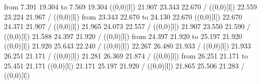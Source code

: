 {{\color[rgb]{0,0,0}\putrule from  7.391 19.304 to  7.569 19.304
}%
%
%
\linethickness=1pt
\setplotsymbol ({\makebox(0,0)[l]{\tencirc{}}})
{\color[rgb]{0,0,0} 21.907 23.343 22.670 /
}%
%
%
\linethickness=1pt
\setplotsymbol ({\makebox(0,0)[l]{\tencirc{}}})
{\color[rgb]{0,0,0} 22.559 23.224 21.967 /
}%
%
%
\linethickness=1pt
\setplotsymbol ({\makebox(0,0)[l]{\tencirc{}}})
{\color[rgb]{0,0,0}\putrule from 23.343 22.670 to 24.130 22.670
}%
%
%
\linethickness=1pt
\setplotsymbol ({\makebox(0,0)[l]{\tencirc{}}})
{\color[rgb]{0,0,0} 22.670 24.371 21.907 /
}%
%
%
\linethickness=1pt
\setplotsymbol ({\makebox(0,0)[l]{\tencirc{}}})
{\color[rgb]{0,0,0} 21.965 24.073 22.557 /
}%
%
%
\linethickness=1pt
\setplotsymbol ({\makebox(0,0)[l]{\tencirc{}}})
{\color[rgb]{0,0,0} 21.907 23.550 21.590 /
}%
%
%
\linethickness=1pt
\setplotsymbol ({\makebox(0,0)[l]{\tencirc{}}})
{\color[rgb]{0,0,0} 21.588 24.397 21.920 /
}%
%
%
\linethickness=1pt
\setplotsymbol ({\makebox(0,0)[l]{\tencirc{}}})
{\color[rgb]{0,0,0}\putrule from 24.397 21.920 to 25.197 21.920
}%
%
%
\linethickness=1pt
\setplotsymbol ({\makebox(0,0)[l]{\tencirc{}}})
{\color[rgb]{0,0,0} 21.920 25.643 22.240 /
}%
%
%
\linethickness=1pt
\setplotsymbol ({\makebox(0,0)[l]{\tencirc{}}})
{\color[rgb]{0,0,0} 22.267 26.480 21.933 /
}%
%
%
\linethickness=1pt
\setplotsymbol ({\makebox(0,0)[l]{\tencirc{}}})
{\color[rgb]{0,0,0} 21.933 26.251 21.171 /
}%
%
%
\linethickness=1pt
\setplotsymbol ({\makebox(0,0)[l]{\tencirc{}}})
{\color[rgb]{0,0,0} 21.281 26.369 21.874 /
}%
%
%
\linethickness=1pt
\setplotsymbol ({\makebox(0,0)[l]{\tencirc{}}})
{\color[rgb]{0,0,0}\putrule from 26.251 21.171 to 25.451 21.171
}%
%
%
\linethickness=1pt
\setplotsymbol ({\makebox(0,0)[l]{\tencirc{}}})
{\color[rgb]{0,0,0} 21.171 25.197 21.920 /
}%
%
%
\linethickness=1pt
\setplotsymbol ({\makebox(0,0)[l]{\tencirc{}}})
{\color[rgb]{0,0,0} 21.865 25.506 21.283 /
}%
%
%
\linethickness=1pt
\setplotsymbol ({\makebox(0,0)[l]{\tencirc{}}})
}
